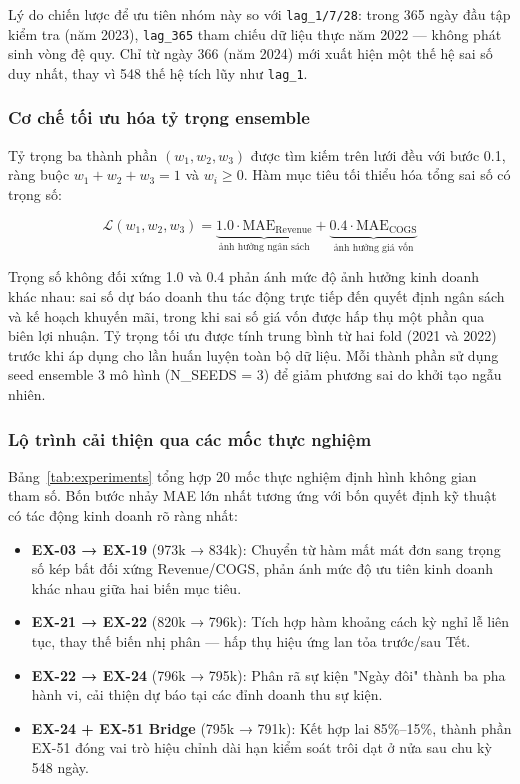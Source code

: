 \documentclass{article}
\begin{document}
Lý do chiến lược để ưu tiên nhóm này so với \texttt{lag\_1/7/28}: trong 365 ngày đầu tập kiểm tra (năm 2023), \texttt{lag\_365} tham chiếu dữ liệu thực năm 2022 — không phát sinh vòng đệ quy. Chỉ từ ngày 366 (năm 2024) mới xuất hiện một thế hệ sai số duy nhất, thay vì 548 thế hệ tích lũy như \texttt{lag\_1}.

\subsubsection{Cơ chế tối ưu hóa tỷ trọng ensemble}

Tỷ trọng ba thành phần $(w_1, w_2, w_3)$ được tìm kiếm trên lưới đều với bước 0.1, ràng buộc $w_1 + w_2 + w_3 = 1$ và $w_i \geq 0$. Hàm mục tiêu tối thiểu hóa tổng sai số có trọng số:

\[
\mathcal{L}(w_1, w_2, w_3) = \underbrace{1.0 \cdot \text{MAE}_{\text{Revenue}}}_{\text{ảnh hưởng ngân sách}} + \underbrace{0.4 \cdot \text{MAE}_{\text{COGS}}}_{\text{ảnh hưởng giá vốn}}
\]

Trọng số không đối xứng 1.0 và 0.4 phản ánh mức độ ảnh hưởng kinh doanh khác nhau: sai số dự báo doanh thu tác động trực tiếp đến quyết định ngân sách và kế hoạch khuyến mãi, trong khi sai số giá vốn được hấp thụ một phần qua biên lợi nhuận. Tỷ trọng tối ưu được tính trung bình từ hai fold (2021 và 2022) trước khi áp dụng cho lần huấn luyện toàn bộ dữ liệu. Mỗi thành phần sử dụng seed ensemble 3 mô hình (N\_SEEDS = 3) để giảm phương sai do khởi tạo ngẫu nhiên.

\subsubsection{Lộ trình cải thiện qua các mốc thực nghiệm}

Bảng~\ref{tab:experiments} tổng hợp 20 mốc thực nghiệm định hình không gian tham số. Bốn bước nhảy MAE lớn nhất tương ứng với bốn quyết định kỹ thuật có tác động kinh doanh rõ ràng nhất:

\begin{itemize}[noitemsep, leftmargin=1.5em]
    \item \textbf{EX-03 → EX-19} (973k → 834k): Chuyển từ hàm mất mát đơn sang trọng số kép bất đối xứng Revenue/COGS, phản ánh mức độ ưu tiên kinh doanh khác nhau giữa hai biến mục tiêu.
    \item \textbf{EX-21 → EX-22} (820k → 796k): Tích hợp hàm khoảng cách kỳ nghỉ lễ liên tục, thay thế biến nhị phân — hấp thụ hiệu ứng lan tỏa trước/sau Tết.
    \item \textbf{EX-22 → EX-24} (796k → 795k): Phân rã sự kiện "Ngày đôi" thành ba pha hành vi, cải thiện dự báo tại các đỉnh doanh thu sự kiện.
    \item \textbf{EX-24 + EX-51 Bridge} (795k → 791k): Kết hợp lai 85\%--15\%, thành phần EX-51 đóng vai trò hiệu chỉnh dài hạn kiểm soát trôi dạt ở nửa sau chu kỳ 548 ngày.
\end{itemize}
\end{document}
